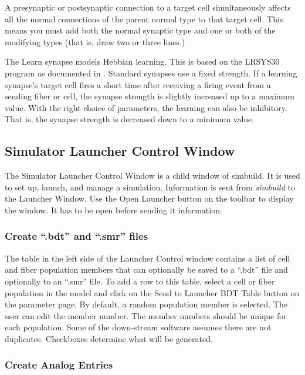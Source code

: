 \documentclass[12pt,openany,oneside]{book}
\newcommand{\prog}[1]{\textit{{#1}}}
\newcommand{\ext}[1]{{{``.#1''}}}
\begin{document}
A presynaptic or postsynaptic connection to a target cell simultaneously
affects all the normal connections of the parent normal type to that
target cell. This means you must add both the normal synaptic type and one
or both of the modifying types (that is, draw two or three lines.)

The Learn synapse models Hebbian learning. This is based on the 
LRSYS30 program as documented in 
\citet{macgregor1987neural}.  Standard synapses use a fixed
strength. If a learning synapse's target cell fires a short 
time after receiving a firing event from a sending fiber or cell, 
the synapse strength is slightly increased up to a maximum value. 
With the right choice of parameters, the learning can also be inhibitory.
That is, the synapse strength is decreased down to a minimum value.


\subsection{Simulator Launcher Control Window}
\label{Simulator Launcher Control Window}
The Simulator Launcher Control Window is a child window of simbuild. It is
used to set up, launch, and manage a simulation. Information is sent from
\prog{simbuild} to the Launcher Window. Use the Open Launcher button on 
the toolbar to display the window.  It has to be open before sending
it information.

\subsubsection{Create \ext{bdt} and \ext{smr} files}
The table in the left side of the Launcher Control window contains a list
of cell and fiber population members that can optionally be saved to a
\ext{bdt} file and optionally to an \ext{smr} file. To add a row to this
table, select a cell or fiber population in the model and click on the
Send to Launcher BDT Table button on the parameter page. By default, a
random population member is selected. The user can edit the member number.
The member numbers should be unique for each population. Some of the
down-stream software assumes there are not duplicates. Checkboxes
determine what will be generated. 

\subsubsection{Create Analog Entries}
\end{document}
